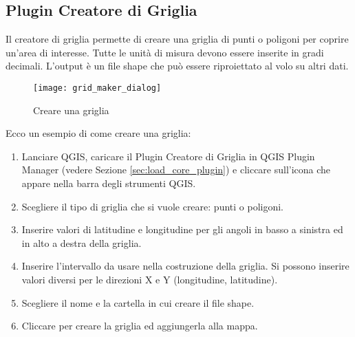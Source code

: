 
\subsection{Plugin Creatore di Griglia}


Il creatore di griglia permette di creare una griglia di punti o poligoni per coprire un'area di interesse.
Tutte le unità di misura devono essere inserite in gradi decimali.
L'output è un file shape che può essere riproiettato al volo su altri dati.

\begin{figure}[ht]
\begin{center}
  \caption{Creare una griglia \nixcaption}\label{fig:graticule}\smallskip
  \texttt{[image: grid\_maker\_dialog]}
\end{center}
\end{figure}

Ecco un esempio di come creare una griglia:

\begin{enumerate}
\item Lanciare QGIS, caricare il Plugin Creatore di Griglia in QGIS Plugin Manager (vedere Sezione 
\ref{sec:load_core_plugin}) e cliccare sull'icona  che appare nella barra degli strumenti QGIS.
\item Scegliere il tipo di griglia che si vuole creare: punti o poligoni.
\item Inserire valori di latitudine e longitudine per gli angoli in basso a sinistra ed in alto a destra della griglia.
\item Inserire l'intervallo da usare nella costruzione della griglia. Si possono inserire valori diversi per le direzioni X e Y (longitudine, latitudine).
\item Scegliere il nome e la cartella in cui creare il file shape.
\item Cliccare  per creare la griglia ed aggiungerla alla mappa.
\end{enumerate} 


